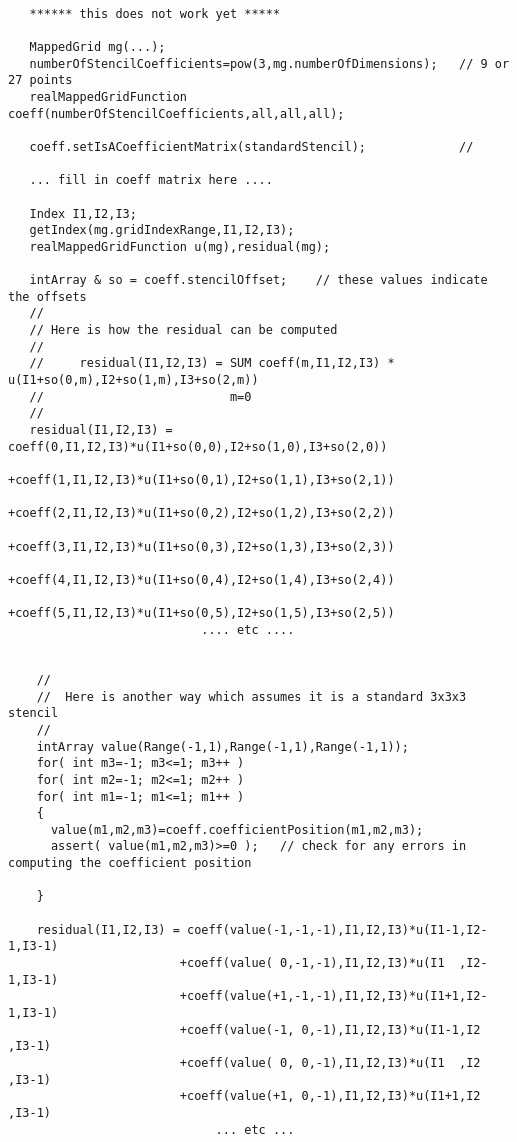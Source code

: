 {\footnotesize
\begin{verbatim}

   ****** this does not work yet *****

   MappedGrid mg(...);
   numberOfStencilCoefficients=pow(3,mg.numberOfDimensions);   // 9 or 27 points
   realMappedGridFunction coeff(numberOfStencilCoefficients,all,all,all);

   coeff.setIsACoefficientMatrix(standardStencil);             // 

   ... fill in coeff matrix here ....

   Index I1,I2,I3;
   getIndex(mg.gridIndexRange,I1,I2,I3);
   realMappedGridFunction u(mg),residual(mg);

   intArray & so = coeff.stencilOffset;    // these values indicate the offsets
   // 
   // Here is how the residual can be computed
   //
   //     residual(I1,I2,I3) = SUM coeff(m,I1,I2,I3) * u(I1+so(0,m),I2+so(1,m),I3+so(2,m))
   //                          m=0 
   //
   residual(I1,I2,I3) = coeff(0,I1,I2,I3)*u(I1+so(0,0),I2+so(1,0),I3+so(2,0))
                       +coeff(1,I1,I2,I3)*u(I1+so(0,1),I2+so(1,1),I3+so(2,1))
                       +coeff(2,I1,I2,I3)*u(I1+so(0,2),I2+so(1,2),I3+so(2,2))
                       +coeff(3,I1,I2,I3)*u(I1+so(0,3),I2+so(1,3),I3+so(2,3))
                       +coeff(4,I1,I2,I3)*u(I1+so(0,4),I2+so(1,4),I3+so(2,4))
                       +coeff(5,I1,I2,I3)*u(I1+so(0,5),I2+so(1,5),I3+so(2,5))
                           .... etc ....


    // 
    //  Here is another way which assumes it is a standard 3x3x3 stencil
    //
    intArray value(Range(-1,1),Range(-1,1),Range(-1,1));
    for( int m3=-1; m3<=1; m3++ )
    for( int m2=-1; m2<=1; m2++ )
    for( int m1=-1; m1<=1; m1++ )
    {
      value(m1,m2,m3)=coeff.coefficientPosition(m1,m2,m3);
      assert( value(m1,m2,m3)>=0 );   // check for any errors in computing the coefficient position
      
    }

    residual(I1,I2,I3) = coeff(value(-1,-1,-1),I1,I2,I3)*u(I1-1,I2-1,I3-1)
                        +coeff(value( 0,-1,-1),I1,I2,I3)*u(I1  ,I2-1,I3-1)
                        +coeff(value(+1,-1,-1),I1,I2,I3)*u(I1+1,I2-1,I3-1)
                        +coeff(value(-1, 0,-1),I1,I2,I3)*u(I1-1,I2  ,I3-1)
                        +coeff(value( 0, 0,-1),I1,I2,I3)*u(I1  ,I2  ,I3-1)
                        +coeff(value(+1, 0,-1),I1,I2,I3)*u(I1+1,I2  ,I3-1)
                             ... etc ...

\end{verbatim}
}
